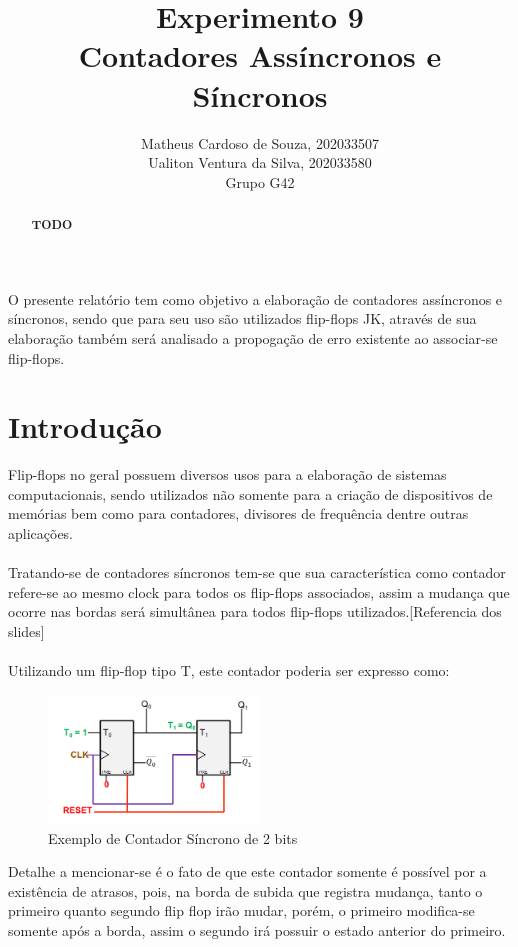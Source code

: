 \documentclass[12pt]{article}
\title{Experimento 9\\
Contadores Assíncronos e Síncronos}
\author{Matheus Cardoso de Souza, 202033507\\
        Ualiton Ventura da Silva, 202033580\\
        Grupo G42
}
\begin{document}
\maketitle

 \begin{abstract}
   \textbf{TODO}
 \end{abstract}

 \begin{resumo}
   O presente relatório tem como objetivo a elaboração de contadores assíncronos
   e síncronos, sendo que para seu uso são utilizados flip-flops JK, através de
   sua elaboração também será analisado a propogação de erro existente ao
   associar-se flip-flops.
 \end{resumo}


\section{Introdução}\label{sec:Introducao}

Flip-flops no geral possuem diversos usos para a elaboração de sistemas
computacionais, sendo utilizados não somente para a criação de dispositivos de
memórias bem como para contadores, divisores de frequência dentre outras
aplicações.\\ \\
Tratando-se de contadores síncronos tem-se que sua característica como contador
refere-se ao mesmo clock para todos os flip-flops associados, assim a mudança
que ocorre nas bordas será simultânea para todos flip-flops
utilizados.[Referencia dos slides] \\ \\
Utilizando um flip-flop tipo T, este contador poderia ser expresso como:
\begin{figure}[H]
  \centering
  \includegraphics[width=0.5\textwidth]{Exp09/images/ContadorSincrono.png}
  \caption{Exemplo de Contador Síncrono de 2 bits}\label{fig:ContadorSincrono.png}
\end{figure}
Detalhe a mencionar-se é o fato de que este contador somente é possível por a
existência de atrasos, pois, na borda de subida que registra mudança, tanto o
primeiro quanto segundo flip flop irão mudar, porém, o primeiro modifica-se
somente após a borda, assim o segundo irá possuir o estado anterior do primeiro.
\end{document}
